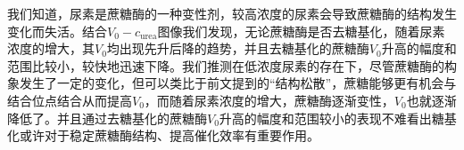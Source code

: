 我们知道，尿素是蔗糖酶的一种变性剂，较高浓度的尿素会导致蔗糖酶的结构发生变化而失活。结合$V_0-c_\mathrm{urea}$图像我们发现，无论蔗糖酶是否去糖基化，随着尿素浓度的增大，其$V_0$均出现先升后降的趋势，并且去糖基化的蔗糖酶$V_0$升高的幅度和范围比较小，较快地迅速下降。我们推测在低浓度尿素的存在下，尽管蔗糖酶的构象发生了一定的变化，但可以类比于前文提到的“结构松散”，蔗糖能够更有机会与结合位点结合从而提高$V_0$，而随着尿素浓度的增大，蔗糖酶逐渐变性，$V_0$也就逐渐降低了。并且通过去糖基化的蔗糖酶$V_0$升高的幅度和范围较小的表现不难看出糖基化或许对于稳定蔗糖酶结构、提高催化效率有重要作用。




%






